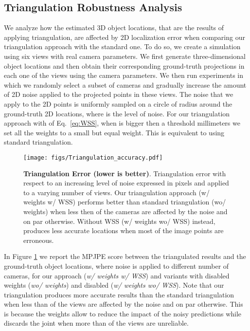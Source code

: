 \documentclass[runningheads]{llncs}
\begin{document}
\subsection*{Triangulation Robustness Analysis}
\label{sec:triangle_robustness}
We analyze how the estimated 3D object locations, that are the results of applying triangulation, are affected by 2D localization error when comparing our triangulation approach with the standard one. To do so, we create a simulation using six views with real camera parameters. We first generate  three-dimensional object locations and then obtain their corresponding ground-truth projections in each one of the views using the camera parameters. We then run experiments in which we randomly select a subset of cameras and gradually increase the amount of 2D noise applied to the projected points in these views. The noise that we apply to the 2D points is uniformly sampled on a circle of radius  around the ground-truth 2D locations, where  is the level of noise. For our triangulation approach with  of Eq.~\ref{eq:WSS}, when  is bigger then a threshold  millimeters we set all the weights to a small but equal weight. This is equivalent to using standard triangulation.
\begin{figure}[ht]
	\centering
\texttt{[image: figs/Triangulation\_accuracy.pdf]}
	\caption{\small\textbf{Triangulation Error (lower is better)}. Triangulation error with respect to an increasing level of noise expressed in pixels and applied to a varying number of views. Our triangulation approach (w/ weights w/ WSS) performs better than standard triangulation (wo/ weights) when less then  of the cameras are affected by the noise and on par otherwise. Without WSS (w/ weights wo/ WSS) instead, produces less accurate locations when most of the image points are erroneous.}
	\label{fig:triang_accuracy}
\end{figure}
In Figure \ref{fig:triang_accuracy} we report the MPJPE score between the triangulated results and the ground-truth object locations, where noise is applied to different number of cameras, for our approach ({\it w/ weights w/ WSS}) and variants with disabled weights ({\it wo/ weights}) and disabled  ({\it w/ weights wo/ WSS}). Note that our triangulation produces more accurate results than the standard triangulation when less than  of the views are affected by the noise and on par otherwise. This is because the weights allow to reduce the impact of the noisy predictions while  discards the joint when more than  of the views are unreliable.
  
\end{document}
